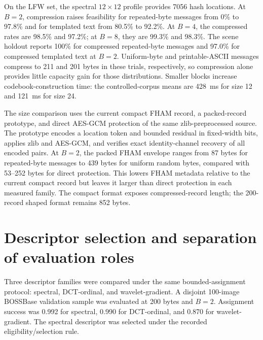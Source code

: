 ﻿\documentclass[11pt,a4paper]{article}
\begin{document}
On the LFW set, the spectral $12\times12$ profile provides 7056 hash
locations. At $B=2$, compression raises feasibility for repeated-byte
messages from 0\% to 97.8\% and for templated text from 80.5\% to 92.2\%.
At $B=4$, the compressed rates are 98.5\% and 97.2\%; at $B=8$, they are
99.3\% and 98.3\%. The scene holdout reports 100\% for compressed
repeated-byte messages and 97.0\% for compressed templated text at $B=2$.
Uniform-byte and printable-ASCII messages compress to 211 and 201 bytes in
these trials, respectively, so compression alone provides little capacity
gain for those distributions. Smaller blocks increase codebook-construction
time: the controlled-corpus means are 428~ms for size 12 and 121~ms for size
24.

The size comparison uses the current compact FHAM record, a packed-record
prototype, and direct AES-GCM protection of the same zlib-preprocessed source.
The prototype encodes a location token and bounded residual in fixed-width
bits, applies zlib and AES-GCM, and verifies exact identity-channel recovery
of all encoded pairs. At $B=2$, the packed FHAM envelope ranges from 87 bytes
for repeated-byte messages to 439 bytes for uniform random bytes, compared
with 53--252 bytes for direct protection. This lowers FHAM metadata relative
to the current compact record but leaves it larger than direct protection in
each measured family. The compact format exposes compressed-record length;
the 200-record shaped format remains 852 bytes.

\begin{table}[h]
\centering
\small
\caption{Preprocessing and Feasibility at 200 Source Bytes}
\resizebox{\linewidth}{!}{}
\end{table}

\begin{table}[h]
\centering
\small
\caption{Protected FHAM Metadata and Direct-Encryption Baseline (Bytes)}
\resizebox{\linewidth}{!}{}
\end{table}

\section{Descriptor selection and separation of evaluation roles}
Three descriptor families were compared under the same bounded-assignment protocol: spectral, DCT-ordinal, and wavelet-gradient. A disjoint 100-image BOSSBase validation sample was evaluated at 200 bytes and $B=2$. Assignment success was 0.992 for spectral, 0.990 for DCT-ordinal, and 0.870 for wavelet-gradient. The spectral descriptor was selected under the recorded eligibility/selection rule.
\end{document}
